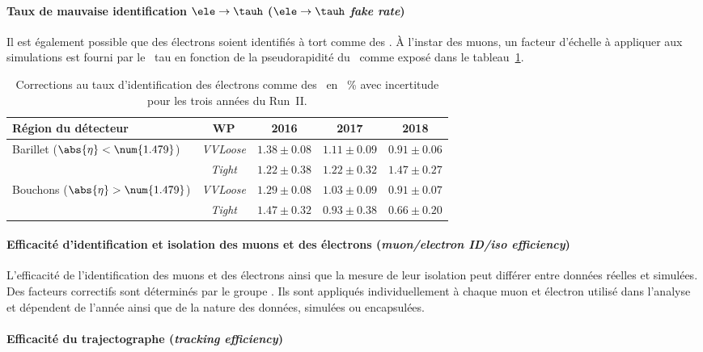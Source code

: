\paragraph{Taux de mauvaise identification $\ele\to\tauh$ (\emph{$\ele\to\tauh$ fake rate})}
Il est également possible que des électrons soient identifiés à tort comme des \tauh.
À l'instar des muons, un facteur d'échelle à appliquer aux simulations est fourni par le \POG\ tau en fonction de la pseudorapidité du \ftauh\ comme exposé dans le tableau~\ref{tab-chapter-HTT_analysis-section-corrections-ele_to_tau_SF}.
\begin{table}[h]
\centering
\begin{tabular}{lcccc}
\toprule
Région du détecteur & WP & 2016 & 2017 & 2018 \\
\midrule
Barillet ($\abs{\eta}<\num{1.479}$) & \emph{VVLoose} & $\num{1.38}\pm\num{0.08}$ & $\num{1.11}\pm\num{0.09}$ & $\num{0.91}\pm\num{0.06}$ \\
 & \emph{Tight} & $\num{1.22}\pm\num{0.38}$ & $\num{1.22}\pm\num{0.32}$ & $\num{1.47}\pm\num{0.27}$ \\
Bouchons ($\abs{\eta}>\num{1.479}$) & \emph{VVLoose} & $\num{1.29}\pm\num{0.08}$ & $\num{1.03}\pm\num{0.09}$ & $\num{0.91}\pm\num{0.07}$ \\
 & \emph{Tight} & $\num{1.47}\pm\num{0.32}$ & $\num{0.93}\pm\num{0.38}$ & $\num{0.66}\pm\num{0.20}$ \\
\bottomrule
\end{tabular}
\caption[Corrections au taux d'identification des électrons comme des \tauh.]{Corrections au taux d'identification des électrons comme des \tauh\ en \SI{}{\%} avec incertitude pour les trois années du Run~II.}
\label{tab-chapter-HTT_analysis-section-corrections-ele_to_tau_SF}
\end{table}
\paragraph{Efficacité d'identification et isolation des muons et des électrons (\emph{muon/electron ID/iso efficiency})}
L'efficacité de l'identification des muons et des électrons ainsi que la mesure de leur isolation peut différer entre données réelles et simulées.
Des facteurs correctifs sont déterminés par le groupe \Higgs\tau\tau.
Ils sont appliqués individuellement à chaque muon et électron utilisé dans l'analyse et dépendent de l'année ainsi que de la nature des données, simulées ou encapsulées.
\paragraph{Efficacité du trajectographe (\emph{tracking efficiency})}
